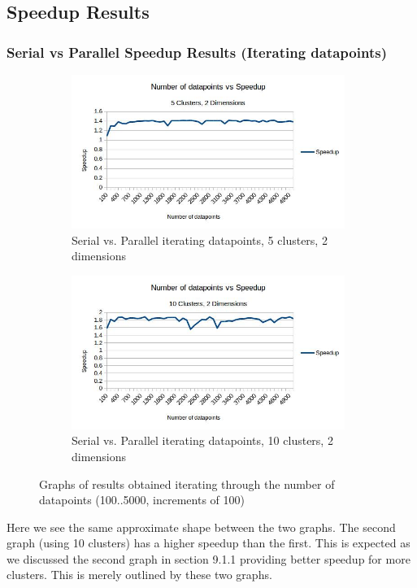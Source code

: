 \documentclass{article}
\begin{document}
\newpage
\subsection{Speedup Results}
\subsubsection{Serial vs Parallel Speedup Results (Iterating datapoints)}
\begin{figure}[h!]
    \begin{subfigure}{0.5\textwidth}
        \includegraphics[width=0.9\linewidth, height=5cm]{Pictures/datapoints1_Speedup.jpg}
        \caption{Serial vs. Parallel iterating datapoints, 5 clusters, 2 dimensions}
    \end{subfigure}
    \begin{subfigure}{0.5\textwidth}
        \includegraphics[width=0.9\linewidth, height=5cm]{Pictures/datapoints2_Speedup.jpg}
        \caption{Serial vs. Parallel iterating datapoints, 10 clusters, 2 dimensions}
    \end{subfigure}
\caption{Graphs of results obtained iterating through the number of datapoints (100..5000, increments of 100)}
\end{figure}

Here we see the same approximate shape between the two graphs. The second graph (using 10 clusters) has a higher speedup than the first. This is expected as we discussed the second graph in section 9.1.1 providing better speedup for more clusters. This is merely outlined by these two graphs. 
\end{document}
